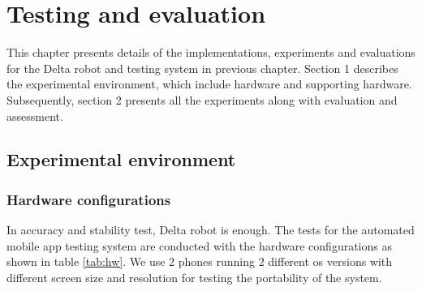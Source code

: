 \chapter{Testing and evaluation}

This chapter presents details of the implementations, experiments and evaluations for the Delta robot and testing system in previous chapter. Section 1 describes the experimental environment, which include hardware and supporting hardware. Subsequently, section 2 presents all the experiments along with evaluation and assessment.

\section{Experimental environment}
\subsection{Hardware configurations}
In accuracy and stability test, Delta robot is enough. The tests for the automated mobile app testing system are conducted with the hardware configurations as shown in table \ref{tab:hw}. We use 2 phones running 2 different \acrshort{os} versions with different screen size and resolution for testing the portability of the system.


